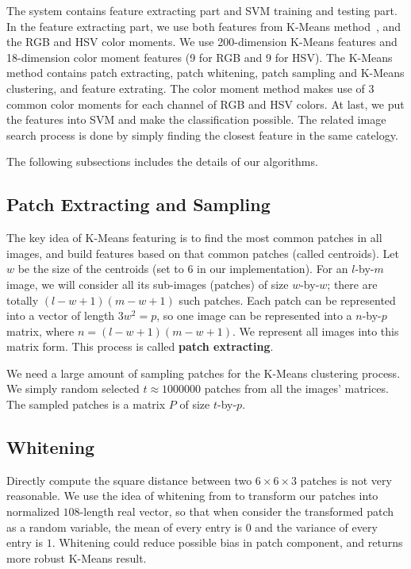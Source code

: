 \documentclass{acm_proc_article-sp}
\begin{document}
The system contains feature extracting part and SVM training and testing part.
In the feature extracting part,
    we use both features from K-Means method~\cite{coates2011analysis},
    and the RGB and HSV color moments.
We use 200-dimension K-Means features and 18-dimension color moment
features (9 for RGB and 9 for HSV).
The K-Means method contains patch extracting, patch whitening,
    patch sampling and K-Means clustering,
    and feature extrating.
The color moment method makes use of 3 common color moments for 
    each channel of RGB and HSV colors.
At last, we put the features into SVM and make the classification possible.
The related image search process is done by simply finding
    the closest feature in the same catelogy.

The following subsections includes the details of our algorithms.

\subsection{Patch Extracting and Sampling}

The key idea of K-Means featuring is to find the most common
    patches in all images, and build features based on that
    common patches (called centroids).
Let $w$ be the size of the centroids (set to $6$ in our implementation).
For an $l$-by-$m$ image,
we will consider all its sub-images (patches) of size $w$-by-$w$;
there are totally $(l-w+1)(m-w+1)$ such patches.
Each patch can be represented into a vector of length $3w^2 = p$,
    so one image can be represented into a $n$-by-$p$ matrix,
    where $n=(l-w+1)(m-w+1)$.
We represent all images into this matrix form.
This process is called \textbf{patch extracting}.

We need a large amount of sampling patches for the K-Means clustering process.
We simply random selected $t\approx 1000000$ patches
    from all the images' matrices.
The sampled patches is a matrix $P$ of size $t$-by-$p$.

\subsection{Whitening}

Directly compute the square distance between two $6\times 6\times 3$ patches is not
very reasonable. We use the idea of whitening from \cite{coates2011analysis} to
transform our patches into normalized $108$-length real vector, so that when
consider the transformed patch as a random variable, the mean of every entry
is $0$ and the variance of every entry is $1$. Whitening could reduce possible
bias in patch component, and returns more robust K-Means result.
\end{document}
